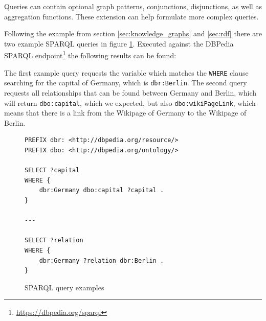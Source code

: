 Queries can contain optional graph patterns, conjunctions, disjunctions, as well as aggregation functions.
These extension can help formulate more complex queries.

Following the example from section \ref{sec:knowledge_graphs} and \ref{sec:rdf} there are two example SPARQL queries in figure \ref{fig:sparql_example}.
Executed against the DBPedia SPARQL endpoint\footnote{\url{https://dbpedia.org/sparql}} the following results can be found:

The first example query requests the variable which matches the \texttt{WHERE} clause searching for the capital of Germany, which is \texttt{dbr:Berlin}.
The second query requests all relationships that can be found between Germany and Berlin, which will return \texttt{dbo:capital}, which we expected, but also \texttt{dbo:wikiPageLink}, which means that there is a link from the Wikipage of Germany to the Wikipage of Berlin.

\begin{figure}[tbph]
	\begin{lstlisting}
PREFIX dbr: <http://dbpedia.org/resource/>
PREFIX dbo: <http://dbpedia.org/ontology/>

SELECT ?capital
WHERE {
	dbr:Germany dbo:capital ?capital .
}

---

SELECT ?relation
WHERE {
	dbr:Germany ?relation dbr:Berlin .
}
	\end{lstlisting}
	\caption{SPARQL query examples}
	\label{fig:sparql_example}
\end{figure}